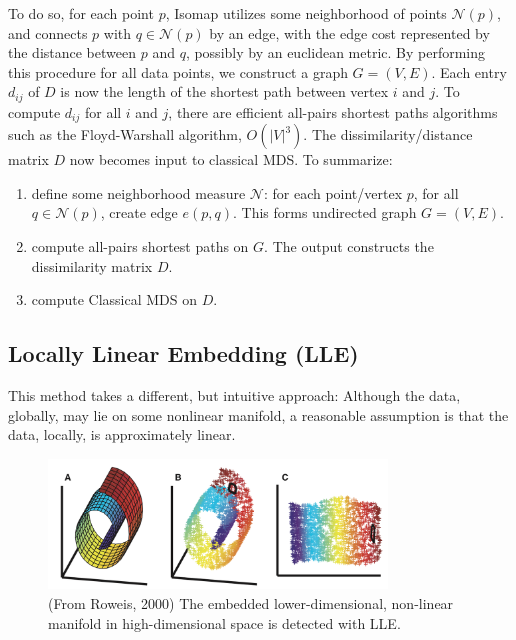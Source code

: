 \documentclass[11pt]{article}
\begin{document}
\begin{multicols}{2}
To do so, for each point $p$, Isomap utilizes some neighborhood of points $\mathcal{N}(p)$, and connects $p$ with $q \in \mathcal{N}(p)$ by an edge, with the edge cost represented by the distance between $p$ and $q$, possibly by an euclidean metric. By performing this procedure for all data points, we construct a graph $G = (V,E)$. Each entry $d_{ij}$ of $D$ is now the length of the shortest path between vertex $i$ and $j$. To compute $d_{ij}$ for all $i$ and $j$, there are efficient all-pairs shortest paths algorithms such as the Floyd-Warshall algorithm, $O(|V|^3)$. The dissimilarity/distance matrix $D$ now becomes input to classical MDS. To summarize:

\begin{enumerate}
\item define some neighborhood measure $\mathcal{N}$: for each point/vertex $p$, for all $q \in \mathcal{N}(p)$, create edge $e(p,q)$. This forms undirected graph $G = (V,E)$.
\item compute all-pairs shortest paths on $G$. The output constructs the dissimilarity matrix $D$.
\item compute Classical MDS on $D$.
\end{enumerate}

\subsection*{Locally Linear Embedding (LLE)}
This method takes a different, but intuitive approach: Although the data, globally, may lie on some nonlinear manifold, a reasonable assumption is that the data, locally, is approximately linear. \\

\begin{figure}[H]
\centering
\includegraphics[width=9cm]{lle.png}
\caption{(From Roweis, 2000) The embedded lower-dimensional, non-linear manifold in high-dimensional space is detected with LLE.}
\end{figure}


\end{multicols}
\end{document}
